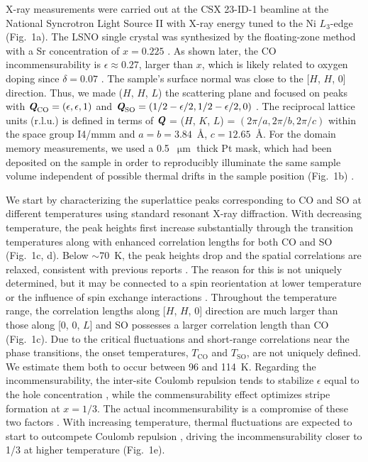 \documentclass[aps,prl,showpacs,floatfix,twocolumn,superscriptaddress,longbibliography]{revtex4-1}
\def\mathbi#1{\ensuremath{\textbf{\em #1}}}
\def\Q{\mathbi{Q}}
\def\QCO{\ensuremath{\mathbi{Q}_{\mathrm{CO}}}}
\def\QSO{\ensuremath{\mathbi{Q}_{\mathrm{SO}}}}
\def\TCO{\ensuremath{T_{\mathrm{CO}}}}
\def\TSO{\ensuremath{T_{\mathrm{SO}}}}
\def\um{\ensuremath{\upmu\text{m}}}
\begin{document}
X-ray measurements were carried out at the \gls{CSX} 23-ID-1 beamline at the National Syncrotron Light Source II with X-ray energy tuned to the Ni $L_3$-edge (Fig.~1a). The \gls{LSNO} single crystal was synthesized by the floating-zone method with a Sr concentration of $x = 0.225$ \cite{Prabhakaran2002growth}. As shown later, the \gls{CO} incommensurability is $\epsilon \approx 0.27$, larger than $x$, which is likely related to oxygen doping since $\delta = 0.07$ \cite{Freeman2006magnetization}. The sample's surface normal was close to the [$H$, $H$, 0] direction. Thus, we made ($H$, $H$, $L$) the scattering plane and focused on peaks with ${\QCO} = (\epsilon, \epsilon, 1)$ and ${\QSO} = (1/2-\epsilon/2, 1/2-\epsilon/2, 0)$ \cite{supp}. The reciprocal lattice units (r.l.u.) is defined in terms of {\Q} = ($H$, $K$, $L$) = $(2\pi/a, 2\pi/b, 2\pi/c)$ within the space group I4/mmm and $a = b = 3.84$~{\AA}, $c = 12.65$~{\AA}. For the domain memory measurements, we used a 0.5~{\um} thick Pt mask, which had been deposited on the sample in order to reproducibly illuminate the same sample volume independent of possible thermal drifts in the sample position (Fig.~1b) \cite{supp}.

We start by characterizing the superlattice peaks corresponding to \gls{CO} and \gls{SO} at different temperatures using standard resonant X-ray diffraction. With decreasing temperature, the peak heights first increase substantially through the transition temperatures along with enhanced correlation lengths for both \gls{CO} and \gls{SO} (Fig.~1c, d). Below $\sim$70~K, the peak heights drop and the spatial correlations are relaxed, consistent with previous reports \cite{Hatton2002LSNO, Ghazi2004LSNO, Schlappa2009LSNO}. The reason for this is not uniquely determined, but it may be connected to a spin reorientation at lower temperature \cite{Freeman2004LSNO} or the influence of spin exchange interactions \cite{Ghazi2004LSNO}. Throughout the temperature range, the correlation lengths along [$H$, $H$, 0] direction are much larger than those along [0, 0, $L$] and \gls{SO} possesses a larger correlation length than \gls{CO} (Fig.~1c). Due to the critical fluctuations and short-range correlations near the phase transitions, the onset temperatures, {\TCO} and {\TSO}, are not uniquely defined. We estimate them both to occur between 96 and 114~K. Regarding the incommensurability, the inter-site Coulomb repulsion tends to stabilize $\epsilon$ equal to the hole concentration \cite{Sachan1995LSNO}, while the commensurability effect optimizes stripe formation at $x = 1/3$. The actual incommensurability is a compromise of these two factors \cite{Yoshizawa2000LSNO}. With increasing temperature, thermal fluctuations are expected to start to outcompete Coulomb repulsion \cite{Hatton2002LSNO, Ishizaka2004LSNO, Miao2019LBCO}, driving the incommensurability closer to 1/3 at higher temperature (Fig.~1e).
\end{document}
